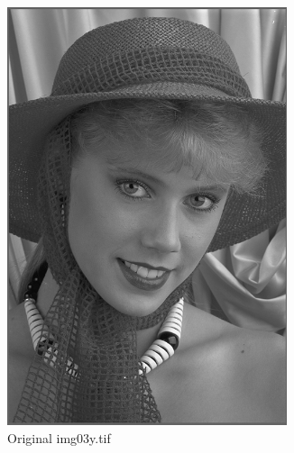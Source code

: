 \documentclass{article}
\begin{document}
			\begin{figure}[!htb]
				\begin{subfigure}{0.3\textwidth}
					\includegraphics[width=0.9\textwidth]{img03y.png}
					\caption{Original img03y.tif}
				\end{subfigure}
				\begin{subfigure}{0.3\textwidth}

\end{subfigure}
\end{figure}
\end{document}
